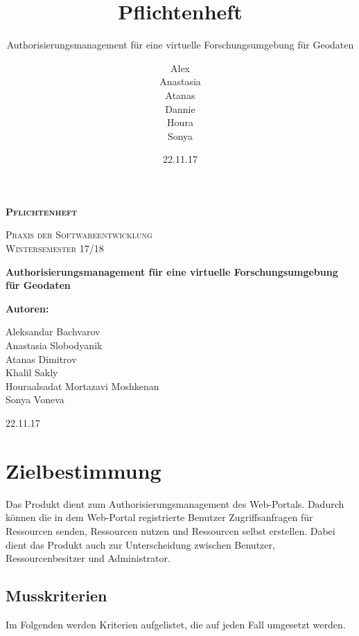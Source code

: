 \documentclass[parskip=full,11pt]{scrartcl}
\title{Pflichtenheft}
\subtitle{Authorisierungsmanagement für eine virtuelle Forschungsumgebung für Geodaten}
\author{Alex\\Anastasia\\Atanas\\Dannie\\ Houra\\Sonya\\}
\date{22.11.17}
\begin{document}
\begin{titlepage}
	
	\begin{center}
	{\scshape\LARGE\bfseries Pflichtenheft \par}
	\vspace{1cm}
	{\scshape\Large Praxis der Softwareentwicklung\\}
	\vspace{1cm}
	{\scshape\Large Wintersemester 17/18\\}
	\vspace{3cm}
	{\huge\bfseries Authorisierungsmanagement für eine virtuelle Forschungsumgebung für Geodaten\par}
	\vspace{2cm}
	\vfill
	{\bfseries {\Large Autoren}:\par}
	{\Large Aleksandar Bachvarov}\\
	{\Large Anastasia Slobodyanik}\\
	{\Large Atanas Dimitrov}\\
	{\Large Khalil Sakly}\\
	{\Large Houraalsadat Mortazavi Moshkenan}\\
	{\Large Sonya Voneva}\\
	\vfill
	{\large 22.11.17 \par}
	\end{center}
\end{titlepage}
\tableofcontents

\newpage
\section{Zielbestimmung}
Das Produkt dient zum Authorisierungsmanagement des \grqq Web-Portals. Dadurch können die in dem \gls{Web-Portal} registrierte \gls{Benutzer} Zugriffsanfragen für Ressourcen senden, Ressourcen nutzen und Ressourcen selbst erstellen. Dabei dient das Produkt auch zur Unterscheidung zwischen Benutzer, \gls{Ressourcenbesitzer} und \gls{Administrator}.

\subsection{Musskriterien}
Im Folgenden werden Kriterien aufgelistet, die auf jeden Fall umgesetzt werden.
\end{document}
